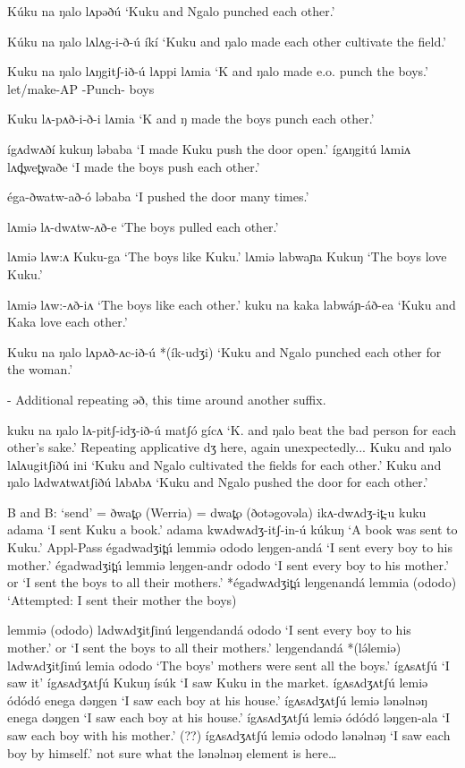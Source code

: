 Kúku na ŋalo lʌpəðú			‘Kuku and Ngalo punched each other.’
 
Kúku na ŋalo lʌlʌg-i-ð-ú íkí		‘Kuku and ŋalo made each other cultivate the field.’

Kuku na ŋalo lʌŋgitʃ-ið-ú lʌppi lʌmia	‘K and ŋalo made e.o. punch the boys.’
    let/make-AP -Punch- boys

Kuku lʌ-pʌð-i-ð-i lʌmia			‘K and ŋ made the boys punch each other.’

 
ígʌdwʌðí kukuŋ ləbaba		‘I made Kuku push the door open.’
ígʌŋgitú lʌmiʌ lʌd̪wet̪waðe		‘I made the boys push each other.’
 
 
éga-ðwatw-að-ó ləbaba			‘I pushed the door many times.’
 
lʌmiə lʌ-dwʌtw-ʌð-e			‘The boys pulled each other.’
 
lʌmiə lʌw:ʌ Kuku-ga			‘The boys like Kuku.’
lʌmiə labwaɲa Kukuŋ			‘The boys love Kuku.’

lʌmiə lʌw:-ʌð-iʌ				‘The boys like each other.’
kuku na kaka labwáɲ-áð-ea		‘Kuku and Kaka love each other.’
 
Kuku na ŋalo lʌpʌð-ʌc-ið-ú *(ík-udʒi)	‘Kuku and Ngalo punched each other for the woman.’

- Additional repeating əð, this time around another suffix.

kuku na ŋalo lʌ-pitʃ-idʒ-ið-ú matʃó gícʌ	‘K. and ŋalo beat the bad person for each other’s sake.’
	 Repeating applicative dʒ here, again unexpectedly...
Kuku and ŋalo lʌlʌugitʃiðú ini		‘Kuku and Ngalo cultivated the fields for each other.’
Kuku and ŋalo lʌdwʌtwʌtʃiðú lʌbʌbʌ	 ‘Kuku and Ngalo pushed the door for each other.’

 
B and B: ‘send’ = ðwat̪o (Werria) = dwat̪o (ðotəgovəla)
ikʌ-dwʌdʒ-it̪-u kuku adama					‘I sent Kuku a book.’		
adama kwʌdwʌdʒ-itʃ-in-ú kúkuŋ			‘A book was sent to Kuku.’	Appl-Pass
égadwadʒit̪ú lemmiə ododo leŋgen-andá		‘I sent every boy to his mother.’	
égadwadʒit̪ú lemmiə leŋgen-andr ododo		‘I sent every boy to his mother.’ or 
‘I sent the boys to all their mothers.’
*égadwʌdʒit̪ú leŋgenandá lemmia (ododo)		‘Attempted: I sent their mother the boys)
 
lemmiə (ododo) lʌdwʌdʒitʃinú leŋgendandá ododo	‘I sent every boy to his mother.’ or 
‘I sent the boys to all their mothers.’
leŋgendandá *(lə́lemiə) lʌdwʌdʒitʃinú lemia ododo	‘The boys’ mothers were sent all the boys.’ 
ígʌsʌtʃú						‘I saw it’
ígʌsʌdʒʌtʃú Kukuŋ ísúk				‘I saw Kuku in the market.
ígʌsʌdʒʌtʃú lemiə ódódó enega dəŋgen		‘I saw each boy at his house.’
ígʌsʌdʒʌtʃú lemiə lənəlnəŋ enega dəŋgen		‘I saw each boy at his house.’
ígʌsʌdʒʌtʃú lemiə ódódó ləŋgen-ala			‘I saw each boy with his mother.’ (??)
ígʌsʌdʒʌtʃú lemiə ododo lənəlnəŋ			‘I saw each boy by himself.’
 not sure what the lənəlnəŋ element is here…
 
